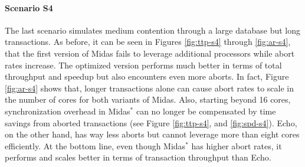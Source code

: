 \paragraph{Scenario S4}

The last scenario simulates medium contention through a large database but long transactions. As before, it can be seen in Figures \ref{fig:ttp-s4} through \ref{fig:ar-s4}, that the first version of Midas fails to leverage additional processors while abort rates increase. The optimized version performs much better in terms of total throughput and speedup but also encounters even more aborts. In fact, Figure \ref{fig:ar-s4} shows that, longer transactions alone can cause abort rates to scale in the number of cores for both variants of Midas. Also, starting beyond 16 cores, synchronization overhead in Midas$^{*}$ can no longer be compensated by time savings from aborted transactions (see Figure \ref{fig:ttp-s4}, and \ref{fig:spd-s4}). Echo, on the other hand, has way less aborts but cannot leverage more than eight cores efficiently. At the bottom line, even though Midas$^{*}$ has higher abort rates, it performs and scales better in terms of transaction throughput than Echo.

